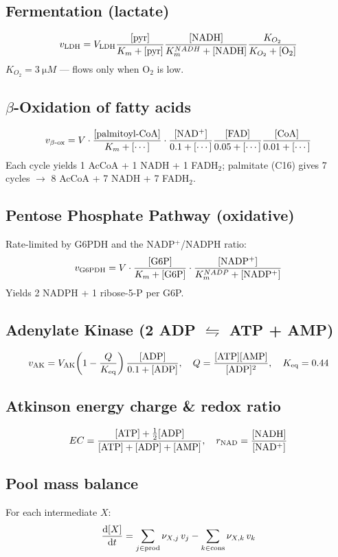 \documentclass[11pt,a4paper]{article}
\newcommand{\eq}[1]{\begin{equation}#1\end{equation}}
\begin{document}
\subsection{Fermentation (lactate)}
\eq{ v_{\rm LDH} = V_{\rm LDH}\frac{[\rm pyr]}{K_m+[\rm pyr]}\frac{[\rm NADH]}{K_m^{NADH}+[\rm NADH]}\frac{K_{O_2}}{K_{O_2}+[\rm O_2]} }
$K_{O_2}=\SI{3}{\micro M}$ --- flows only when O$_2$ is low.

\subsection{$\beta$-Oxidation of fatty acids}
\eq{ v_{\beta\text{-ox}} = V\cdot\frac{[\rm palmitoyl\text{-}CoA]}{K_m+[\cdots]}\cdot\frac{[\rm NAD^+]}{0.1+[\cdots]}\frac{[\rm FAD]}{0.05+[\cdots]}\frac{[\rm CoA]}{0.01+[\cdots]} }
Each cycle yields 1 AcCoA + 1 NADH + 1 FADH$_2$; palmitate (C16) gives 7 cycles $\to$ 8 AcCoA + 7 NADH + 7 FADH$_2$.

\subsection{Pentose Phosphate Pathway (oxidative)}
Rate-limited by G6PDH and the NADP$^+$/NADPH ratio:
\eq{ v_{\rm G6PDH} = V\cdot\frac{[\rm G6P]}{K_m+[\rm G6P]}\cdot\frac{[\rm NADP^+]}{K_m^{NADP}+[\rm NADP^+]} }
Yields 2 NADPH + 1 ribose-5-P per G6P.

\subsection{Adenylate Kinase (2 ADP $\leftrightharpoons$ ATP + AMP)}
\eq{ v_{\rm AK} = V_{\rm AK}\!\left(1-\frac{Q}{K_{\rm eq}}\right)\frac{[\rm ADP]}{0.1+[\rm ADP]},\quad Q=\frac{[\rm ATP][\rm AMP]}{[\rm ADP]^2},\quad K_{\rm eq}=0.44 }

\subsection{Atkinson energy charge \& redox ratio}
\eq{ EC = \frac{[\rm ATP]+\tfrac12[\rm ADP]}{[\rm ATP]+[\rm ADP]+[\rm AMP]},\quad r_{\rm NAD} = \frac{[\rm NADH]}{[\rm NAD^+]} }

\subsection{Pool mass balance}
For each intermediate $X$:
\eq{ \frac{\mathrm d[X]}{\mathrm dt} = \sum_{j\in\rm prod}\nu_{X,j}\,v_j - \sum_{k\in\rm cons}\nu_{X,k}\,v_k }
\end{document}
